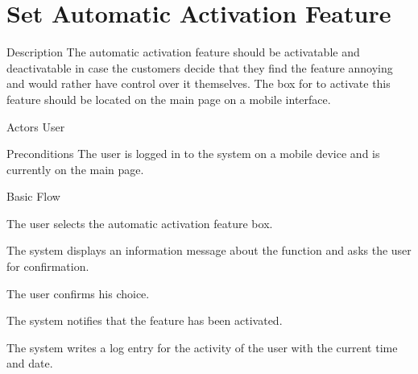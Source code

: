 \section{Set Automatic Activation Feature}

%
\begin{cpart}{Description}
The automatic activation feature should be activatable and deactivatable in case the customers decide that they find the feature annoying and would rather have control over it themselves. The box for to activate this feature should be located on the main page on a mobile interface.
\end{cpart}


%
\begin{cpart}{Actors}
User
\end{cpart}

%
\begin{cpart}{Preconditions}
The user is logged in to the system on a mobile device and is currently on the main page.
\end{cpart}

%
\begin{cpartList}{Basic Flow}
  \item The user selects the automatic activation feature box.
  \item The system displays an information message about the function and asks the user for confirmation.
  \item The user confirms his choice.
  \item The system notifies that the feature has been activated.
  \item The system writes a log entry for the activity of the user with the current time and date.
\end{cpartList}

